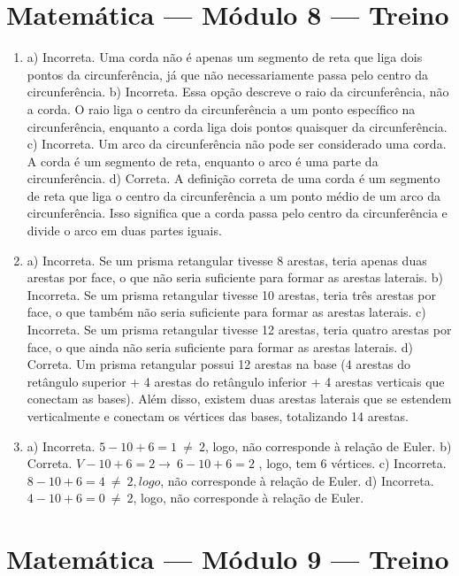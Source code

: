 \section*{Matemática — Módulo 8 — Treino}

\begin{enumerate}
\item a) Incorreta. Uma corda não é apenas um segmento de reta que liga dois pontos da circunferência, já que não necessariamente passa pelo centro da circunferência.
b) Incorreta. Essa opção descreve o raio da circunferência, não a corda. O raio liga o centro da circunferência a um ponto específico na
circunferência, enquanto a corda liga dois pontos quaisquer da circunferência.
c) Incorreta. Um arco da circunferência não pode ser considerado uma corda. A corda é um segmento de reta, enquanto o arco é uma parte da circunferência.
d) Correta. A definição correta de uma corda é um segmento de reta que liga o centro da circunferência a um ponto médio de um arco da
circunferência. Isso significa que a corda passa pelo centro da circunferência e divide o arco em duas partes iguais.

\item a) Incorreta. Se um prisma retangular tivesse 8 arestas, teria apenas duas arestas por face, o que não seria suficiente para formar as arestas laterais.
b) Incorreta. Se um prisma retangular tivesse 10 arestas, teria três arestas por face, o que também não seria suficiente para formar as arestas laterais.
c) Incorreta. Se um prisma retangular tivesse 12 arestas, teria quatro arestas por face, o que ainda não seria suficiente para formar as arestas laterais.
d) Correta. Um prisma retangular possui 12 arestas na base (4 arestas do retângulo superior + 4 arestas do retângulo inferior + 4 arestas verticais que conectam as bases). Além disso, existem duas
arestas laterais que se estendem verticalmente e conectam os vértices
das bases, totalizando 14 arestas.

\item a) Incorreta. $5 - 10 + 6 = 1\  \neq \ 2$, logo, não corresponde à relação de Euler.
b) Correta. $V - 10 + 6 = 2 \rightarrow \ 6 - 10 + 6 = 2$ , logo, tem 6 vértices.
c) Incorreta. $8 - 10 + 6 = 4\  \neq \ 2, logo$, não corresponde à relação de Euler.
d) Incorreta. $4 - 10 + 6 = 0\  \neq \ 2$, logo, não corresponde à relação de Euler.
\end{enumerate}

\section*{Matemática — Módulo 9 — Treino}


